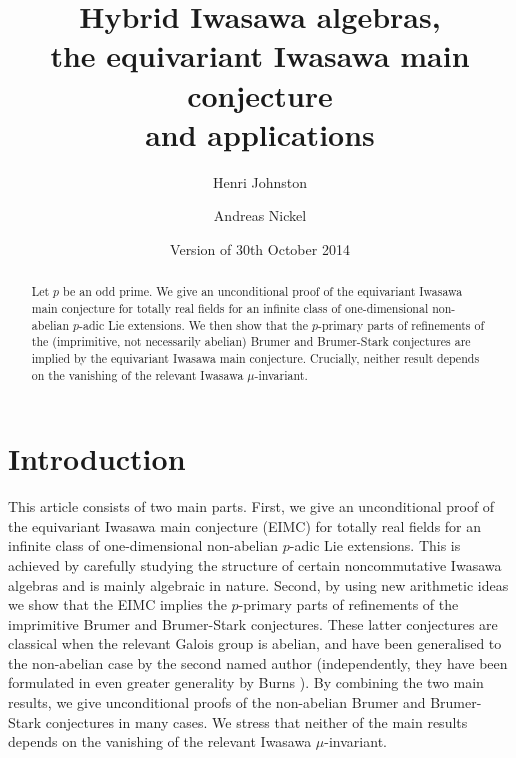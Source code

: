 \documentclass[12pt]{amsart}
\title[Hybrid Iwasawa algebras and the equivariant Iwasawa main conjecture]
    {Hybrid Iwasawa algebras,\\ the equivariant Iwasawa main conjecture\\ and applications}
\author{Henri Johnston}
\author{Andreas Nickel}
\date{Version of 30th October 2014}
\theoremstyle{plain}
\theoremstyle{remark}
\theoremstyle{definition}
\numberwithin{equation}{section}
\begin{document}
\maketitle

\begin{abstract}
Let $p$ be an odd prime.
We give an unconditional proof of the equivariant Iwasawa main conjecture for totally real fields
for an infinite class of one-dimensional non-abelian $p$-adic Lie extensions.
We then show that the $p$-primary parts of refinements of the
(imprimitive, not necessarily abelian) Brumer and Brumer-Stark conjectures are
implied by the equivariant Iwasawa main conjecture.
Crucially, neither result depends on the vanishing of the relevant Iwasawa $\mu$-invariant.
\end{abstract}

\section{Introduction}

This article consists of two main parts.
First, we give an unconditional proof of the
equivariant Iwasawa main conjecture (EIMC) for totally real fields
for an infinite class of one-dimensional non-abelian $p$-adic Lie extensions.
This is achieved by carefully studying the structure of certain noncommutative Iwasawa algebras and is mainly algebraic in nature.
Second, by using new arithmetic ideas we show that the EIMC implies the $p$-primary parts of refinements of the
imprimitive Brumer and Brumer-Stark conjectures.
These latter conjectures are classical when the relevant Galois group is abelian, and have been generalised to 
the non-abelian case by the second named author \cite{MR2976321} (independently,
they have been formulated in even greater generality by Burns \cite{MR2845620}).
By combining the two main results, we give unconditional proofs of 
the non-abelian Brumer and Brumer-Stark conjectures in many cases.
We stress that neither of the main results depends on the vanishing of the relevant Iwasawa $\mu$-invariant.\\
\end{document}
